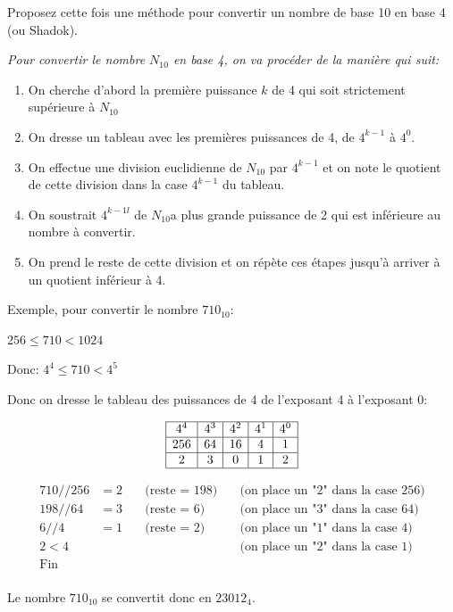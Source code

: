 \documentclass[12pt]{article}
\newenvironment{MaReponse}
		{\begin{greyedtextbox}\itshape} %
		{\end{greyedtextbox}}            %
\begin{document}
	\begin{MonExo}
		Proposez cette fois une méthode pour convertir un nombre de base 10 en base 4 (ou Shadok).
	\end{MonExo}
	
	\begin{MaReponse}
		Pour convertir le nombre $N_{10}$ en base 4, on va procéder de la manière qui suit:
		\begin{enumerate}
			\item On cherche d'abord la première puissance $k$ de 4 qui soit strictement supérieure à $N_{10}$
			\item On dresse un tableau avec les premières puissances de 4, de $4^{k-1}$ à $4^0$.
			\item On effectue une division euclidienne de $N_{10}$ par $4^{k-1}$ et on note le quotient de cette division dans la case $4^{k-1}$ du tableau.
			\item On soustrait $4^{k-1l}$ de $N_{10}$a plus grande puissance de 2 qui est inférieure au nombre à convertir.
			\item On prend le reste de cette division et on répète ces étapes jusqu'à arriver à un quotient inférieur à 4.
		\end{enumerate}

		Exemple, pour convertir le nombre $710_{10}$:
		
		$256 \le 710 < 1024$

		Donc: $4^4 \le 710 < 4^5$
		
		Donc on dresse le tableau des puissances de 4 de l'exposant 4 à l'exposant 0:
		
		\[
		\begin{array}{|c|c|c|c|c|c|c|}
		\hline
		4^4 & 4^3 & 4^2 & 4^1 & 4^0 \\
		\hline
		256 & 64 & 16 & 4 & 1 \\
		\hline
		2 & 3 & 0 & 1 & 2 \\
		\hline
		\end{array}
		\]
		
		\[
		\begin{array}{llll}
		710 // 256 &= 2 &\quad \text{(reste = } 198 \text{)} &\quad \text{(on place un "2" dans la case \(256\))} \\
		198 // 64 &= 3 &\quad \text{(reste = } 6 \text{)} &\quad \text{(on place un "3" dans la case \(64\))} \\
		6 // 4 &= 1 &\quad \text{(reste = } 2 \text{)} &\quad \text{(on place un "1" dans la case \(4\))} \\
		2 < 4 &&&\quad \text{(on place un "2" dans la case \(1\))} \\
		\text{Fin} & \\
		\end{array}
		\]
		
		Le nombre \(710_{10}\) se convertit donc en \(23012_{4}\).
		
	\end{MaReponse}
		
\end{document}
